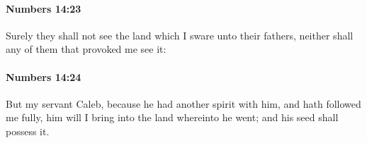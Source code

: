 		\paragraph{Numbers 14:23} %
			\label{NUMBERS-14-23}

			Surely they shall not see the land which I sware unto their fathers, neither shall any of them that provoked me see it:


		\paragraph{Numbers 14:24} %
			\label{NUMBERS-14-24}

			But my servant Caleb, because he had another spirit with him, and hath followed me fully, him will I bring into the land whereinto he went; and his seed shall possess it.


